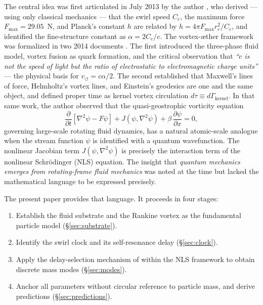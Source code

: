 \documentclass[11pt,a4paper]{article}
\begin{document}
The central idea was first articulated in July 2013 by the author
\cite{Iskandarani2013}, who derived --- using only classical mechanics ---
that the swirl speed $C_e$, the maximum force $F_{\max} = 29.05$~N, and Planck's
constant $h$ are related by $h = 4\pi F_{\max}r_c^2/C_e$, and identified the
fine-structure constant as $\alpha = 2C_e/c$.
The vortex-\ae ther framework was formalized in two 2014 documents
\cite{Iskandarani2014a,Iskandarani2014VAM}.
The first \cite{Iskandarani2014a} introduced the three-phase fluid model,
vortex fusion as quark formation, and the critical observation that
\textit{``$c$ is not the speed of light but the ratio of electrostatic to
electromagnetic charge units''} --- the physical basis for
$v_\circlearrowleft = c\alpha/2$.
The second \cite{Iskandarani2014VAM} established that Maxwell's lines of force,
Helmholtz's vortex lines, and Einstein's geodesics are one and the same object,
and defined proper time as kernel vortex circulation
$d\tau \equiv d\Gamma_{\text{kernel}}$.
In that same work, the author observed that the quasi-geostrophic vorticity equation
\[
  \frac{\partial}{\partial t}\left[\nabla^2\psi - F\psi\right]
  + J(\psi, \nabla^2\psi)
  + \beta\,\frac{\partial\psi}{\partial x} = 0,
\]
governing large-scale rotating fluid dynamics, has a natural atomic-scale analogue
when the stream function $\psi$ is identified with a quantum wavefunction. The
nonlinear Jacobian term $J(\psi,\nabla^2\psi)$ is precisely the interaction term of
the nonlinear Schr\"{o}dinger (NLS) equation. The insight that
\emph{quantum mechanics emerges from rotating-frame fluid mechanics} was
noted at the time but lacked the mathematical language to be expressed precisely.

The present paper provides that language. It proceeds in four stages:
\begin{enumerate}
  \item Establish the fluid substrate and the Rankine vortex as the fundamental
        particle model (\S\ref{sec:substrate}).
  \item Identify the swirl clock and its self-resonance delay (\S\ref{sec:clock}).
  \item Apply the delay-selection mechanism of \cite{Iskandarani2026AIP} within
        the NLS framework to obtain discrete mass modes (\S\ref{sec:modes}).
  \item Anchor all parameters without circular reference to particle mass, and
        derive predictions (\S\ref{sec:predictions}).
\end{enumerate}
\end{document}
